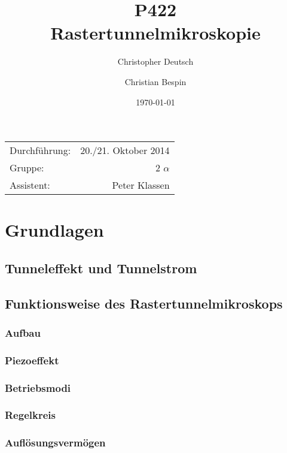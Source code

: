 \documentclass[10pt, a4paper]{article}
\title{P422 \\ Rastertunnelmikroskopie}
\author{Christopher Deutsch \and Christian Bespin}
\date{\today}
\begin{document}
  
\maketitle

\begin{center}
\begin{tabular}{l r}
Durchführung: & 20./21. Oktober 2014 \\
Gruppe: & 2 $\alpha$ \\
Assistent: & Peter Klassen
\end{tabular}
\end{center}

\begin{abstract}
\end{abstract}

\tableofcontents
\newpage

\section{Grundlagen}

\subsection{Tunneleffekt und Tunnelstrom}

\subsection{Funktionsweise des Rastertunnelmikroskops}
\subsubsection{Aufbau}
\subsubsection{Piezoeffekt}
\subsubsection{Betriebsmodi}
\subsubsection{Regelkreis}
\subsubsection{Auflösungsvermögen}
\end{document}
